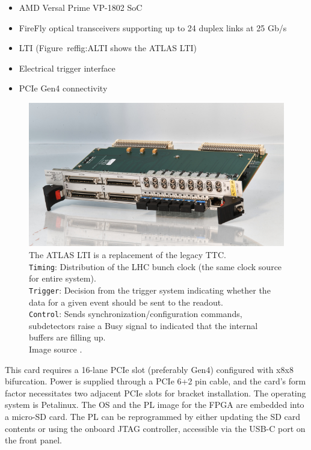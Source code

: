 \begin{itemize}
    \item AMD Versal Prime VP-1802 \acf{SoC}
    \item FireFly optical transceivers supporting up to 24 duplex links at 25 Gb/s \cite{firefly-optical-transceiver}
    \item \acf{LTI} (Figure~ref{fig:ALTI} shows the \acs{ATLAS} \acl{LTI})
    \item Electrical trigger interface
    \item \acs{PCIe} Gen4 connectivity
\end{itemize}

\begin{figure}[htbp]
\centering
\includegraphics[width=\textwidth]{images/felix/lti.jpg}
\caption[ATLAS Local Trigger Interface]{The ATLAS \acl{LTI} is a replacement of the legacy \acf{TTC}.\\ \texttt{Timing}: Distribution of the \acs{LHC} bunch clock (the same clock source for entire system).\\\texttt{Trigger}: Decision from the trigger system indicating whether the data for a given event should be sent to the readout.\\ \texttt{Control}: Sends synchronization/configuration commands, subdetectors raise a Busy signal to indicated that the internal buffers are filling up.\\Image source \protect\cite{alti}.}
\label{fig:ALTI}
\end{figure}

This card requires a 16-lane \acs{PCIe} slot (preferably Gen4) configured with x8x8 bifurcation. Power is supplied through a \acs{PCIe} 6+2 pin cable, and the card's form factor necessitates two adjacent \acs{PCIe} slots for bracket installation. 
The operating system is Petalinux. The OS and the \acl{PL} image for the \acs{FPGA} are embedded into a micro-SD card. The \acs{PL} can be reprogrammed by either updating the SD card contents or using the onboard \ac{JTAG} controller, accessible via the USB-C port on the front panel.

